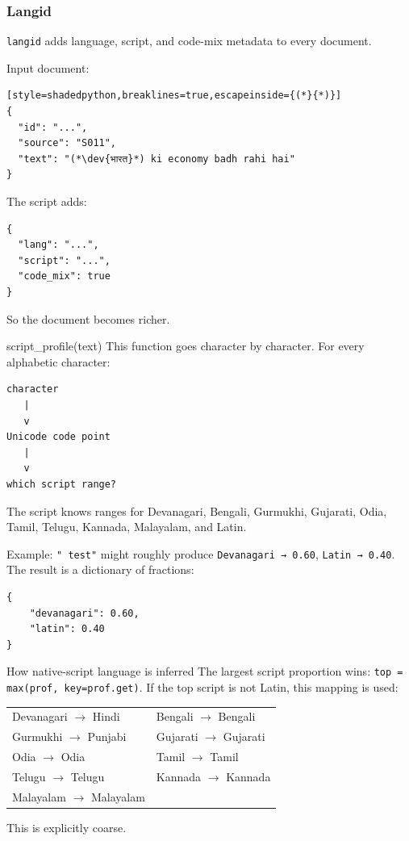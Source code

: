 \subsubsection{Langid}

\texttt{langid} adds language, script, and code-mix metadata to every
document.

Input document:
\begin{lstlisting}[style=shadedpython,breaklines=true,escapeinside={(*}{*)}]
{
  "id": "...",
  "source": "S011",
  "text": "(*\dev{भारत}*) ki economy badh rahi hai"
}
\end{lstlisting}
The script adds:
\begin{lstlisting}[style=shadedpython,breaklines=true]
{
  "lang": "...",
  "script": "...",
  "code_mix": true
}
\end{lstlisting}
So the document becomes richer.

\begin{paragraphblock}{script\_profile(text)}
  This function goes character by character. For every alphabetic character:
\begin{lstlisting}[style=shadedpython,language={},basicstyle=\scriptsize\ttfamily]
character
   |
   v
Unicode code point
   |
   v
which script range?
\end{lstlisting}
  The script knows ranges for Devanagari, Bengali, Gurmukhi, Gujarati, Odia,
  Tamil, Telugu, Kannada, Malayalam, and Latin.

  Example: \texttt{"}\texttt{ test"} might roughly produce
  \texttt{Devanagari → 0.60}, \texttt{Latin → 0.40}. The result is a
  dictionary of fractions:
\begin{lstlisting}[style=shadedpython,breaklines=true]
{
    "devanagari": 0.60,
    "latin": 0.40
}
\end{lstlisting}
\end{paragraphblock}

\begin{paragraphblock}{How native-script language is inferred}
  The largest script proportion wins: \texttt{top = max(prof, key=prof.get)}.
  If the top script is not Latin, this mapping is used:
  \begin{center}
    \renewcommand{\arraystretch}{1.15}
    \small
    \begin{tabular}{@{}ll@{}}
      Devanagari $\rightarrow$ Hindi &
      Bengali $\rightarrow$ Bengali \\
      Gurmukhi $\rightarrow$ Punjabi &
      Gujarati $\rightarrow$ Gujarati \\
      Odia $\rightarrow$ Odia &
      Tamil $\rightarrow$ Tamil \\
      Telugu $\rightarrow$ Telugu &
      Kannada $\rightarrow$ Kannada \\
      Malayalam $\rightarrow$ Malayalam &
    \end{tabular}
  \end{center}
  This is explicitly coarse.
\end{paragraphblock}

